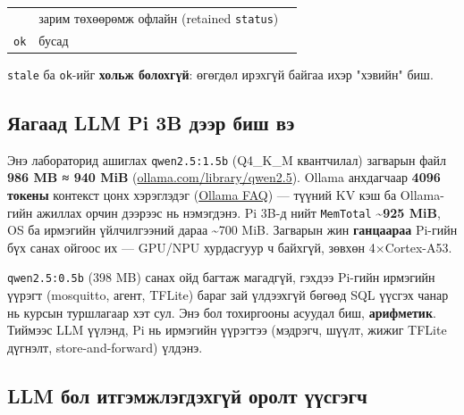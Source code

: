\begin{longtable}[]{@{}lll@{}}
\begin{minipage}[t]{0.30\columnwidth}
\end{minipage} & \begin{minipage}[t]{0.30\columnwidth}\raggedright
зарим төхөөрөмж офлайн (retained \texttt{status})\strut
\end{minipage}\tabularnewline
\begin{minipage}[t]{0.30\columnwidth}\raggedright
\texttt{ok}\strut
\end{minipage} & \begin{minipage}[t]{0.30\columnwidth}\raggedright
бусад\strut
\end{minipage} & \begin{minipage}[t]{0.30\columnwidth}\raggedright
\strut
\end{minipage}\tabularnewline
\bottomrule
\end{longtable}\endgroup

\texttt{stale} ба \texttt{ok}-ийг \textbf{хольж болохгүй}: өгөгдөл ирэхгүй байгаа ихэр "хэвийн" биш.

\hypertarget{ux44fux430ux433ux430ux430ux434-llm-pi-3b-ux434ux44dux44dux440-ux431ux438ux448-ux432ux44d}{%
\subsection{Яагаад LLM Pi 3B дээр биш вэ}\label{ux44fux430ux433ux430ux430ux434-llm-pi-3b-ux434ux44dux44dux440-ux431ux438ux448-ux432ux44d}}

Энэ лабораторид ашиглах \texttt{qwen2.5:1.5b} (Q4\_K\_M квантчилал) загварын файл \textbf{986 MB ≈ 940 MiB} (\href{https://ollama.com/library/qwen2.5/tags}{ollama.\allowbreak{}com/\allowbreak{}library/\allowbreak{}qwen2.\allowbreak{}5}). Ollama анхдагчаар \textbf{4096 токены} контекст цонх хэрэглэдэг (\href{https://docs.ollama.com/faq}{Ollama FAQ}) --- түүний KV кэш ба Ollama-гийн ажиллах орчин дээрээс нь нэмэгдэнэ. Pi 3B-д нийт \texttt{MemTotal} \textbf{\textasciitilde925 MiB}, OS ба ирмэгийн үйлчилгээний дараа \textasciitilde700 MiB. Загварын жин \textbf{ганцаараа} Pi-гийн бүх санах ойгоос их --- GPU/NPU хурдасгуур ч байхгүй, зөвхөн 4×Cortex-A53.

\texttt{qwen2.5:0.5b} (398 MB) санах ойд багтаж магадгүй, гэхдээ Pi-гийн ирмэгийн үүрэгт (mosquitto, агент, TFLite) бараг зай үлдээхгүй бөгөөд SQL үүсгэх чанар нь курсын туршлагаар хэт сул. Энэ бол тохиргооны асуудал биш, \textbf{арифметик}. Тиймээс LLM үүлэнд, Pi нь ирмэгийн үүрэгтээ (мэдрэгч, шүүлт, жижиг TFLite дүгнэлт, store-and-forward) үлдэнэ.

\hypertarget{llm-ux431ux43eux43b-ux438ux442ux433ux44dux43cux436ux43bux44dux433ux434ux44dux445ux433ux4afux439-ux43eux440ux43eux43bux442-ux4afux4afux441ux433ux44dux433ux447}{%
\subsection{LLM бол итгэмжлэгдэхгүй оролт үүсгэгч}\label{llm-ux431ux43eux43b-ux438ux442ux433ux44dux43cux436ux43bux44dux433ux434ux44dux445ux433ux4afux439-ux43eux440ux43eux43bux442-ux4afux4afux441ux433ux44dux433ux447}}

